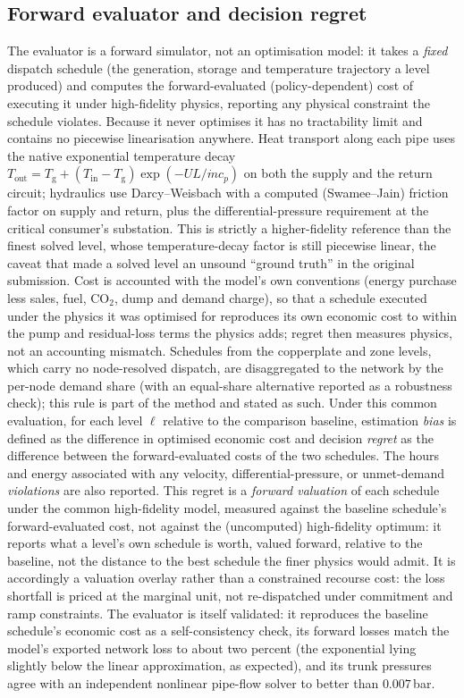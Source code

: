 \documentclass[a4paper,fleqn]{cas-sc}
\begin{document}
\subsection{Forward evaluator and decision regret}
\label{subsec:evaluator}
The evaluator is a forward simulator, not an optimisation model: it takes a \emph{fixed}
dispatch schedule (the generation, storage and temperature trajectory a level produced)
and computes the forward-evaluated (policy-dependent) cost of executing it under high-fidelity
physics, reporting any physical
constraint the schedule violates. Because it never optimises it has no tractability limit and
contains no piecewise linearisation anywhere. Heat transport along each pipe uses the native
exponential temperature decay $T_\text{out}=T_\text{g}+(T_\text{in}-T_\text{g})\exp(-U L/\dot m
c_p)$ on both the supply and the return circuit; hydraulics use Darcy--Weisbach with a
computed (Swamee--Jain) friction factor on supply and return, plus the differential-pressure
requirement at the critical consumer's substation. This is strictly a higher-fidelity
reference than the finest solved level, whose temperature-decay factor is still piecewise
linear, the caveat that made a solved level an unsound ``ground truth'' in the original
submission. Cost is accounted with the model's own conventions (energy purchase less sales,
fuel, CO$_2$, dump and demand charge), so that a schedule executed under the physics it was
optimised for reproduces its own economic cost to within the pump and residual-loss terms
the physics adds; regret then measures physics, not an accounting mismatch. Schedules from the
copperplate and zone levels, which carry no node-resolved dispatch, are disaggregated to the
network by the per-node demand share (with an equal-share alternative reported as a
robustness check); this rule is part of the method and stated as such. Under this common evaluation, for each level \(\ell\) relative to the comparison baseline,
estimation \emph{bias} is defined as the difference in optimised economic cost and decision
\emph{regret} as the difference between the forward-evaluated costs of the two schedules.
The hours and energy associated with any velocity, differential-pressure, or unmet-demand
\emph{violations} are also reported. This regret is a \emph{forward valuation} of each
schedule under the common high-fidelity model, measured against the baseline schedule's
forward-evaluated cost, not against the (uncomputed) high-fidelity optimum: it reports what a
level's own schedule is worth, valued forward, relative to the baseline, not the distance to
the best schedule the finer physics would admit. It is accordingly a valuation overlay rather
than a constrained recourse cost: the loss shortfall is priced at the marginal unit, not
re-dispatched under commitment and ramp constraints. The evaluator
is itself validated: it reproduces the baseline schedule's economic cost as a self-consistency
check, its forward losses match the model's exported network loss to about two percent (the
exponential lying slightly below the linear approximation, as expected), and its trunk
pressures agree with an independent nonlinear pipe-flow solver to better than $0.007$\,bar.
\end{document}
